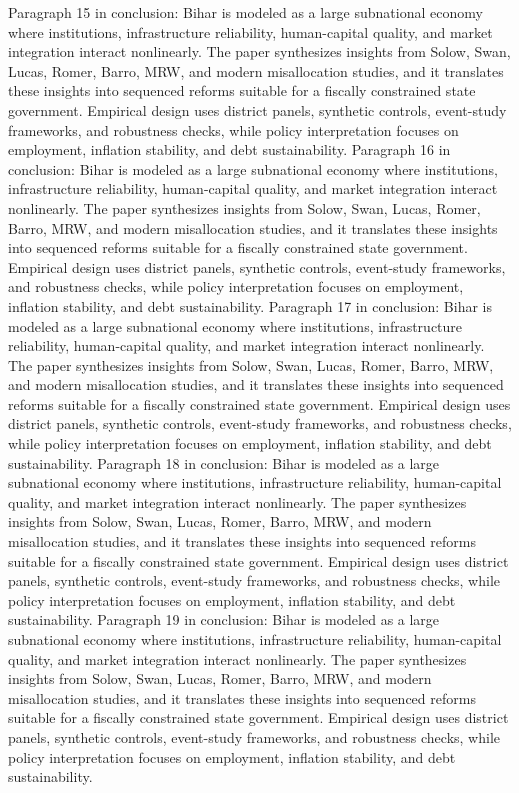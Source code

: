 \documentclass[preprint,12pt]{elsarticle}
\begin{document}
Paragraph 15 in conclusion: Bihar is modeled as a large subnational economy where institutions, infrastructure reliability, human-capital quality, and market integration interact nonlinearly. The paper synthesizes insights from Solow, Swan, Lucas, Romer, Barro, MRW, and modern misallocation studies, and it translates these insights into sequenced reforms suitable for a fiscally constrained state government. Empirical design uses district panels, synthetic controls, event-study frameworks, and robustness checks, while policy interpretation focuses on employment, inflation stability, and debt sustainability.
Paragraph 16 in conclusion: Bihar is modeled as a large subnational economy where institutions, infrastructure reliability, human-capital quality, and market integration interact nonlinearly. The paper synthesizes insights from Solow, Swan, Lucas, Romer, Barro, MRW, and modern misallocation studies, and it translates these insights into sequenced reforms suitable for a fiscally constrained state government. Empirical design uses district panels, synthetic controls, event-study frameworks, and robustness checks, while policy interpretation focuses on employment, inflation stability, and debt sustainability.
Paragraph 17 in conclusion: Bihar is modeled as a large subnational economy where institutions, infrastructure reliability, human-capital quality, and market integration interact nonlinearly. The paper synthesizes insights from Solow, Swan, Lucas, Romer, Barro, MRW, and modern misallocation studies, and it translates these insights into sequenced reforms suitable for a fiscally constrained state government. Empirical design uses district panels, synthetic controls, event-study frameworks, and robustness checks, while policy interpretation focuses on employment, inflation stability, and debt sustainability.
Paragraph 18 in conclusion: Bihar is modeled as a large subnational economy where institutions, infrastructure reliability, human-capital quality, and market integration interact nonlinearly. The paper synthesizes insights from Solow, Swan, Lucas, Romer, Barro, MRW, and modern misallocation studies, and it translates these insights into sequenced reforms suitable for a fiscally constrained state government. Empirical design uses district panels, synthetic controls, event-study frameworks, and robustness checks, while policy interpretation focuses on employment, inflation stability, and debt sustainability.
Paragraph 19 in conclusion: Bihar is modeled as a large subnational economy where institutions, infrastructure reliability, human-capital quality, and market integration interact nonlinearly. The paper synthesizes insights from Solow, Swan, Lucas, Romer, Barro, MRW, and modern misallocation studies, and it translates these insights into sequenced reforms suitable for a fiscally constrained state government. Empirical design uses district panels, synthetic controls, event-study frameworks, and robustness checks, while policy interpretation focuses on employment, inflation stability, and debt sustainability.
\end{document}

